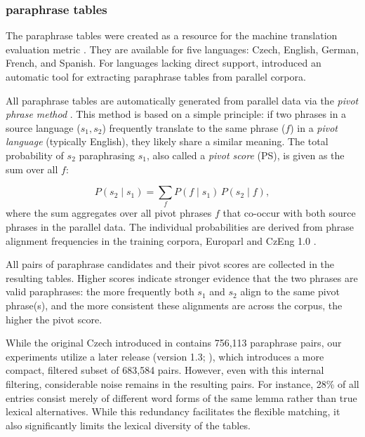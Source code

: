 \subsubsection{\meteor paraphrase tables} 
\label{meteori}
The \meteor paraphrase tables were created as a resource for the \mn machine translation evaluation metric \citep{meteor-tables}. They are available for five languages: Czech, English, German, French, and Spanish. For languages lacking direct support, \cite{denkowski-lavie-2014-meteor} introduced an automatic tool for extracting paraphrase tables from parallel corpora.

All \meteor paraphrase tables are automatically generated from parallel data via the \textit{pivot phrase method} \citep{pivoting}. This method is based on a simple principle: if two phrases in a source language ($s_1,s_2$) frequently translate to the same phrase ($f$) in a \textit{pivot language} (typically English), they likely share a similar meaning. The total probability of $s_2$ paraphrasing $s_1$, also called a \emph{pivot score} (PS), is given as the sum over all $f$:

\begin{equation*}
P(s_2 \mid s_1) = \sum_{f} P(f \mid s_1) \, P(s_2 \mid f), 
\end{equation*}
where the sum aggregates over all pivot phrases $f$ that co-occur with both source phrases in the parallel data. The individual probabilities are derived from phrase alignment frequencies in the training corpora, Europarl \citep{koehn-2005-europarl} and CzEng 1.0 \citep{czeng10:lrec2012}.

All pairs of paraphrase candidates and their pivot scores are collected in the resulting tables. Higher scores indicate stronger evidence that the two phrases are valid paraphrases: the more frequently both $s_1$ and $s_2$ align to the same pivot phrase(s), and the more consistent these alignments are across the corpus, the higher the pivot score.

While the original Czech \mpt introduced in \cite{meteor-tables} contains 756,113 paraphrase pairs, our experiments utilize a later release (version 1.3; \citealp{meteor-wmt:2011}), which introduces a more compact, filtered subset of 683,584 pairs. However, even with this internal filtering, considerable noise remains in the resulting pairs. For instance, 28\% of all entries consist merely of different word forms of the same lemma rather than true lexical alternatives. While this redundancy facilitates the \mn flexible matching, it also significantly limits the lexical diversity of the tables.

